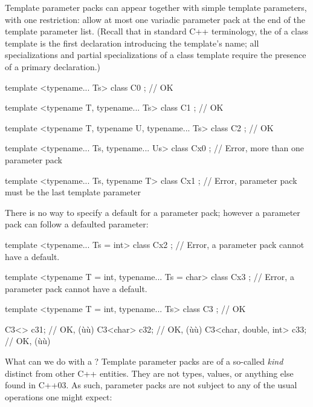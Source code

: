 \noindent Template parameter packs can appear together with simple template
parameters, with one restriction:  allow at most one variadic parameter pack at the end of
the template parameter list. (Recall that in standard C++ terminology,
the  of a class template is the first
declaration introducing the template's name; all specializations and
partial specializations of a class template require the presence of a
primary declaration.)

\begin{emcppslisting}[emcppserrorlines={10,13}]
template <typename... Ts>
class C0  { };  // OK

template <typename T, typename... Ts>
class C1  { };  // OK

template <typename T, typename U, typename... Ts>
class C2  { };  // OK

template <typename... Ts, typename... Us>
class Cx0 { };  // Error, more than one parameter pack

template <typename... Ts, typename T>
class Cx1 { };  // Error, parameter pack must be the last template parameter
\end{emcppslisting}
    

\noindent There is no way to specify a default for a parameter pack; however a
parameter pack can follow a defaulted parameter:

\begin{emcppslisting}[emcppserrorlines={1,4}]
template <typename... Ts = int>
class Cx2 { };  // Error, a parameter pack cannot have a default.

template <typename T = int, typename... Ts = char>
class Cx3 { };  // Error, a parameter pack cannot have a default.

template <typename T = int, typename... Ts>
class C3  { };  // OK

C3<> c31;                   // OK, (ù{}ù)
C3<char> c32;               // OK, (ù{}ù)
C3<char, double, int> c33;  // OK, (ù{}ù)
\end{emcppslisting}
    

\noindent What can we do with a ? Template
parameter packs are of a so-called \emph{kind} distinct from other C++
entities. They are not types, values, or anything else found in C++03.
As such, parameter packs are not subject to any of the usual operations
one might expect:

